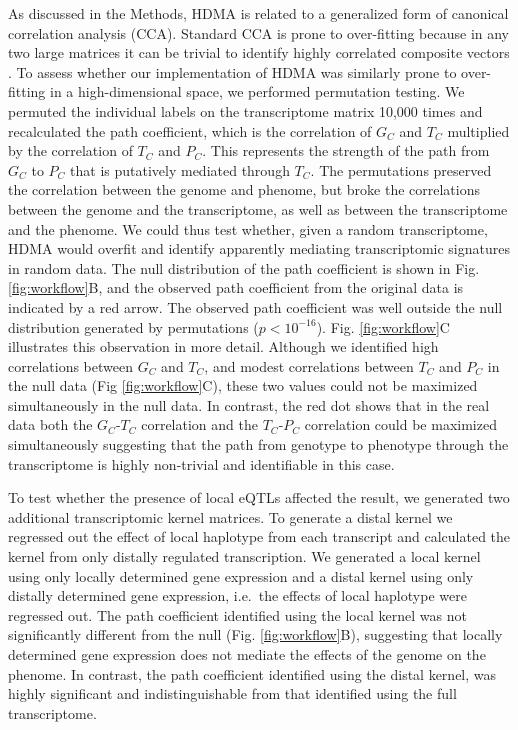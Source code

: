 \documentclass[
]{article}
\begin{document}
As discussed in the Methods, HDMA is related to a generalized form of
canonical correlation analysis (CCA). Standard CCA is prone to
over-fitting because in any two large matrices it can be trivial to
identify highly correlated composite vectors \cite{pmid38383808}. To
assess whether our implementation of HDMA was similarly prone to
over-fitting in a high-dimensional space, we performed permutation
testing. We permuted the individual labels on the transcriptome matrix
10,000 times and recalculated the path coefficient, which is the
correlation of \(G_C\) and \(T_C\) multiplied by the correlation of
\(T_C\) and \(P_C\). This represents the strength of the path from
\(G_C\) to \(P_C\) that is putatively mediated through \(T_C\). The
permutations preserved the correlation between the genome and phenome,
but broke the correlations between the genome and the transcriptome, as
well as between the transcriptome and the phenome. We could thus test
whether, given a random transcriptome, HDMA would overfit and identify
apparently mediating transcriptomic signatures in random data. The null
distribution of the path coefficient is shown in Fig.
\ref{fig:workflow}B, and the observed path coefficient from the original
data is indicated by a red arrow. The observed path coefficient was well
outside the null distribution generated by permutations
(\(p < 10^{-16}\)). Fig. \ref{fig:workflow}C illustrates this
observation in more detail. Although we identified high correlations
between \(G_C\) and \(T_C\), and modest correlations between \(T_C\) and
\(P_C\) in the null data (Fig \ref{fig:workflow}C), these two values
could not be maximized simultaneously in the null data. In contrast, the
red dot shows that in the real data both the \(G_C\)-\(T_C\) correlation
and the \(T_C\)-\(P_C\) correlation could be maximized simultaneously
suggesting that the path from genotype to phenotype through the
transcriptome is highly non-trivial and identifiable in this case.

To test whether the presence of local eQTLs affected the result, we
generated two additional transcriptomic kernel matrices. To generate a
distal kernel we regressed out the effect of local haplotype from each
transcript and calculated the kernel from only distally regulated
transcription. We generated a local kernel using only locally determined
gene expression and a distal kernel using only distally determined gene
expression, i.e.~the effects of local haplotype were regressed out. The
path coefficient identified using the local kernel was not significantly
different from the null (Fig. \ref{fig:workflow}B), suggesting that
locally determined gene expression does not mediate the effects of the
genome on the phenome. In contrast, the path coefficient identified
using the distal kernel, was highly significant and indistinguishable
from that identified using the full transcriptome.
\end{document}
